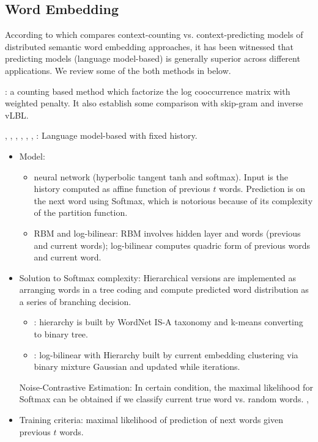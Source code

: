 \documentclass{article} %
\begin{document}
\subsection{Word Embedding}
According to \cite{baroni2014don} which compares context-counting vs.
context-predicting models of distributed semantic word embedding approaches, it has
been witnessed that predicting models (language model-based) is generally
superior across different applications. We review some of the both methods in
below.

\cite{pennington2014glove}:
a counting based method which factorize the log cooccurrence matrix with
	weighted penalty. It also establish some comparison with skip-gram and
	inverse vLBL.

\cite{bengio2003neural}, \cite{morin2005hierarchical},
	\cite{mnih2007three}, \cite{mnih2009scalable}, \cite{mnih2012fast},
	\cite{mnih2013learning}, : Language model-based with fixed history.
\begin{itemize}
\item Model:
	\begin{itemize}
	\item neural network (hyperbolic tangent $\mathrm{tanh}$ and softmax).
	Input is the history computed as affine function of previous $t$ words.
	Prediction is on the next word using Softmax, which is notorious because of
	its complexity of the partition function. \cite{bengio2003neural}
	\item RBM and log-bilinear: RBM involves hidden layer and words (previous
	and current words); log-bilinear computes quadric form of previous words
	and current word. \cite{mnih2007three}
	\end{itemize}
\item Solution to Softmax complexity:
	Hierarchical versions are implemented as arranging words in a tree coding
	and compute predicted word distribution as a series of branching decision.
	\begin{itemize}
	\item \cite{morin2005hierarchical}: hierarchy is built by WordNet IS-A
			taxonomy and k-means converting to binary tree.
	\item \cite{mnih2009scalable}: log-bilinear with Hierarchy built by current
		embedding clustering via binary mixture Gaussian and updated while
		iterations.
	\end{itemize}
	Noise-Contrastive Estimation: In certain condition, the maximal likelihood
	for Softmax can be obtained if we classify current true word vs. random
	words. \cite{mnih2012fast},\cite{mnih2013learning}
\item Training criteria: maximal likelihood of prediction of next words given
    previous $t$ words.
\end{itemize}
\end{document}
